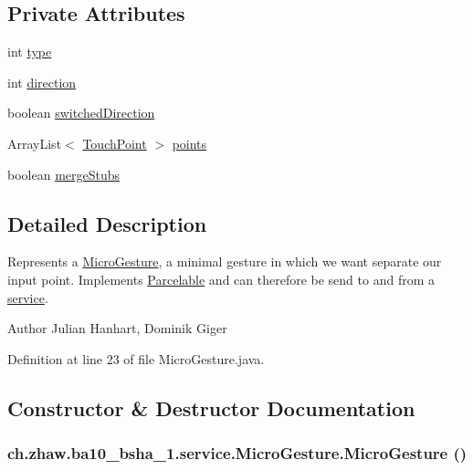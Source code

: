 \subsection*{Private Attributes}
\begin{DoxyCompactItemize}
\item 
int \hyperlink{classch_1_1zhaw_1_1ba10__bsha__1_1_1service_1_1MicroGesture_ac1ee8b835a0b20d0e3535682eb0d2741}{type}
\item 
int \hyperlink{classch_1_1zhaw_1_1ba10__bsha__1_1_1service_1_1MicroGesture_af599becac7054d4356b17da8eee187b0}{direction}
\item 
boolean \hyperlink{classch_1_1zhaw_1_1ba10__bsha__1_1_1service_1_1MicroGesture_aaddd90c10ceefbedf0dc527d93989b84}{switchedDirection}
\item 
ArrayList$<$ \hyperlink{classch_1_1zhaw_1_1ba10__bsha__1_1_1TouchPoint}{TouchPoint} $>$ \hyperlink{classch_1_1zhaw_1_1ba10__bsha__1_1_1service_1_1MicroGesture_a3eb0c61e8503400680d21d305ca58356}{points}
\item 
boolean \hyperlink{classch_1_1zhaw_1_1ba10__bsha__1_1_1service_1_1MicroGesture_ad6fe6b70a61b144c8868ff32478d7d5a}{mergeStubs}
\end{DoxyCompactItemize}


\subsection{Detailed Description}
Represents a \hyperlink{classch_1_1zhaw_1_1ba10__bsha__1_1_1service_1_1MicroGesture}{MicroGesture}, a minimal gesture in which we want separate our input point. Implements \hyperlink{}{Parcelable} and can therefore be send to and from a \hyperlink{namespacech_1_1zhaw_1_1ba10__bsha__1_1_1service}{service}.

\begin{DoxyAuthor}{Author}
Julian Hanhart, Dominik Giger 
\end{DoxyAuthor}


Definition at line 23 of file MicroGesture.java.

\subsection{Constructor \& Destructor Documentation}
\hypertarget{classch_1_1zhaw_1_1ba10__bsha__1_1_1service_1_1MicroGesture_a751ff230434387aa91538c649520745b}{
\subsubsection[{MicroGesture}]{\setlength{\rightskip}{0pt plus 5cm}ch.zhaw.ba10\_\-bsha\_\-1.service.MicroGesture.MicroGesture ()}}
\label{classch_1_1zhaw_1_1ba10__bsha__1_1_1service_1_1MicroGesture_a751ff230434387aa91538c649520745b}



